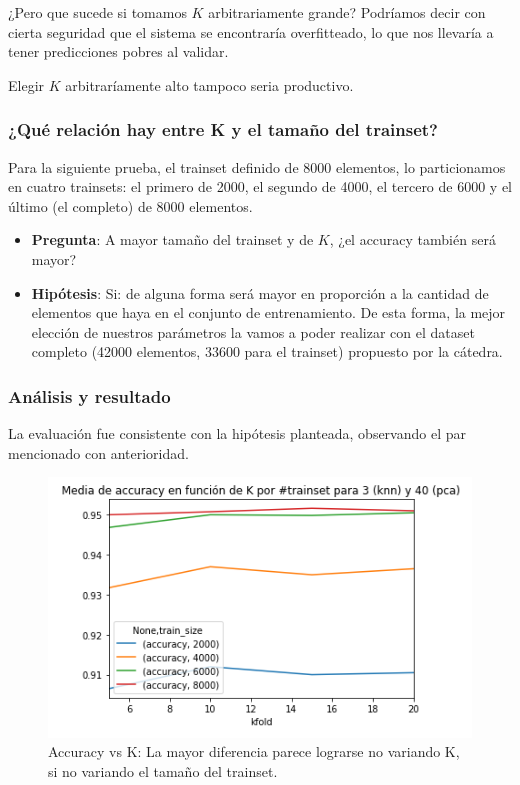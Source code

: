 ¿Pero que sucede si tomamos $K$ arbitrariamente grande? Podríamos decir con cierta seguridad que el sistema se encontraría overfitteado, lo que nos llevaría a tener predicciones pobres al validar.

Elegir $K$ arbitraríamente alto tampoco seria productivo.

\subsubsection{¿Qué relación hay entre K y el tamaño del trainset?}\label{KFoldTrainSizeAcc}

Para la siguiente prueba, el trainset definido de 8000 elementos, lo particionamos en cuatro trainsets: el primero de 2000, el segundo de 4000, el tercero de 6000 y el último (el completo) de 8000 elementos.

\begin{itemize}
    \item \textbf{Pregunta}: A mayor tamaño del trainset y de $K$, ¿el accuracy también será mayor?
    \item \textbf{Hipótesis}: Si: de alguna forma será mayor en proporción a la cantidad de elementos que haya en el conjunto de entrenamiento. De esta forma, la mejor elección de nuestros parámetros la vamos a poder realizar con el dataset completo (42000 elementos, 33600 para el trainset) propuesto por la cátedra.
\end{itemize}

\subsubsection*{Análisis y resultado}

La evaluación fue consistente con la hipótesis planteada, observando el par mencionado con anterioridad.

\begin{figure}[H]
    \centering
    \includegraphics[scale=0.7]{images/KFoldAccTrainSize.png}
    \caption{Accuracy vs K: La mayor diferencia parece lograrse no variando K, si no variando el tamaño del trainset.}
    \label{fig:KFoldAccTrainSize}
\end{figure}

